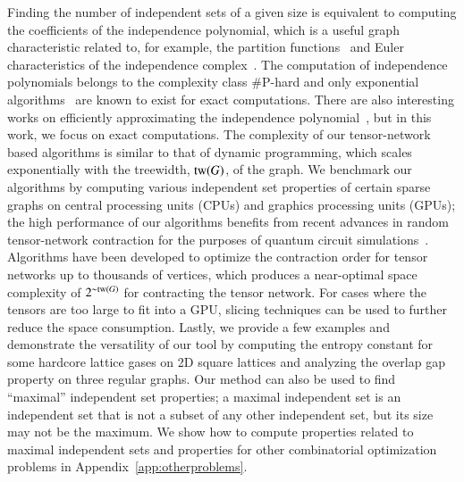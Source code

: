 \documentclass[onefignum, onetabnum]{siamart190516}
\newcommand{\<}{\langle}
\renewcommand{\>}{\rangle}
\newcommand{\App}[1]{Appendix~\ref{#1}}
\newcounter{example}
\begin{document}
Finding the number of independent sets of a given size is equivalent to computing the coefficients of the independence polynomial,
which is a useful graph characteristic related to, for example, the partition functions~\cite{Lee1952,Yang1952} and Euler characteristics of the independence complex~\cite{Bousquet2008, Levit2009}.
The computation of independence polynomials belongs to the complexity class \#P-hard 
and only exponential algorithms~\cite{Ferrin2014} are known to exist for exact computations.
There are also interesting works on efficiently approximating the independence polynomial~\cite{Harvey2018}, but in this work, we focus on exact computations. 
The complexity of our tensor-network based algorithms is similar to that of dynamic programming, which scales exponentially with the treewidth, ${\rm tw}(G)$, of the graph.
We benchmark our algorithms by computing various independent set properties of certain sparse graphs on central processing units (CPUs) and graphics processing units (GPUs); the high performance of our algorithms benefits from recent advances in random tensor-network contraction for the purposes of quantum circuit simulations~\cite{Gray2021, Pan2021, Kalachev2021}.
Algorithms have been developed to optimize the contraction order for tensor networks up to thousands of vertices, which produces a near-optimal space complexity of $2^{\sim{\rm tw}(G)}$ for contracting the tensor network.
For cases where the tensors are too large to fit into a GPU, slicing techniques can be used to further reduce the space consumption.
Lastly, we provide a few examples and demonstrate the versatility of our tool by computing the entropy constant for some hardcore lattice gases on 2D square lattices and analyzing the overlap gap property on three regular graphs.
Our method can also be used to find ``maximal'' independent set properties; 
a maximal independent set is an independent set that is not a subset of any other independent set, but its size may not be the maximum. 
We show how to compute properties related to maximal independent sets and properties for other combinatorial optimization problems in \App{app:otherproblems}.
\end{document}
